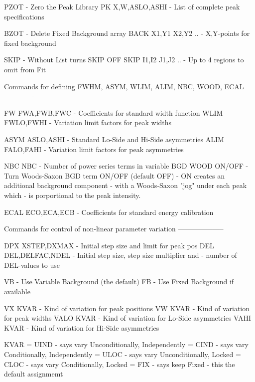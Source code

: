    PZOT                   - Zero the Peak Library
   PK     X,W,ASLO,ASHI   - List of complete peak specifications
 
   BZOT                   - Delete Fixed Background array
   BACK   X1,Y1 X2,Y2 ..  - X,Y-points for fixed background
 
   SKIP                   - Without List turns SKIP OFF
   SKIP   I1,I2 J1,J2 ..  - Up to 4 regions to omit from Fit
 
   Commands for defining FWHM, ASYM, WLIM, ALIM, NBC, WOOD, ECAL -------------
 
   FW     FWA,FWB,FWC     - Coefficients for standard width function
   WLIM   FWLO,FWHI       - Variation limit factors for peak widths
 
   ASYM   ASLO,ASHI       - Standard Lo-Side and Hi-Side asymmetries
   ALIM   FALO,FAHI       - Variation limit factors for peak asymmetries
 
   NBC    NBC             - Number of power series terms in variable BGD
   WOOD   ON/OFF          - Turn Woods-Saxon BGD term ON/OFF (default OFF)
                          - ON creates an additional background component
                          - with a Woods-Saxon "jog" under each peak which
                          - is porportional to the peak intensity.
 
   ECAL   ECO,ECA,ECB     - Coefficients for standard energy calibration
 
   Commands for control of non-linear parameter variation --------------------
 
   DPX    XSTEP,DXMAX     - Initial step size and limit for peak pos
   DEL    DEL,DELFAC,NDEL - Initial step size, step size multiplier and
                          - number of DEL-values to use
 
   VB                     - Use Variable Background (the default)
   FB                     - Use Fixed Background if available
 
   VX     KVAR            - Kind of variation for peak positions
   VW     KVAR            - Kind of variation for peak widths
   VALO   KVAR            - Kind of variation for Lo-Side asymmetries
   VAHI   KVAR            - Kind of variation for Hi-Side asymmetries
 
          KVAR = UIND     - says vary Unconditionally, Independently
               = CIND     - says vary   Conditionally, Independently
               = ULOC     - says vary Unconditionally, Locked
               = CLOC     - says vary   Conditionally, Locked
               = FIX      - says keep Fixed - this the default assignmemt
 
